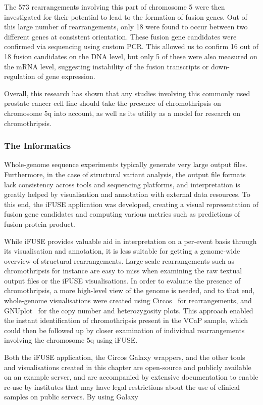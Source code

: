 The 573 rearrangements involving this part of chromosome 5 were then investigated for their potential to lead to the formation of fusion genes. Out of this large number of rearrangements, only 18 were found to occur between two different genes at consistent orientation. These fusion gene candidates were confirmed via sequencing using custom PCR. This allowed us to confirm 16 out of 18 fusion candidates on the DNA level, but only 5 of these were also measured on the mRNA level, suggesting instability of the fusion transcripts or down-regulation of gene expression.

Overall, this research has shown that any studies involving this commonly used prostate cancer cell line should take the presence of chromothripsis on chromosome 5q into account, as well as its utility as a model for research on chromothripsis.

\subsubsection{The Informatics}
Whole-genome sequence experiments typically generate very large output files. Furthermore, in the case of structural variant analysis, the output file formats lack consistency across tools and sequencing platforms, and interpretation is greatly helped by visualisation and annotation with external data resources. To this end, the iFUSE application was developed, creating a visual representation of fusion gene candidates and computing various metrics such as predictions of fusion protein product.

While iFUSE provides valuable aid in interpretation on a per-event basis through its visualisation and annotation, it is less suitable for getting a genome-wide overview of structural rearrangements. Large-scale rearrangements such as chromothripsis for instance are easy to miss when examining the raw textual output files or the iFUSE visualisations. In order to evaluate the presence of chromothripsis, a more high-level view of the genome is needed, and to that end, whole-genome visualisations were created using Circos~\cite{circos} for rearrangements, and GNUplot~\cite{url-gnuplot} for the copy number and heterozygosity plots. This approach enabled the instant identification of chromothripsis present in the VCaP sample, which could then be followed up by closer examination of individual rearrangements involving the chromosome 5q using iFUSE.

Both the iFUSE application, the Circos Galaxy wrappers, and the other tools and visualisations created in this chapter are open-source and publicly available on an example server, and are accompanied by extensive documentation to enable re-use by institutes that may have legal restrictions about the use of clinical samples on public servers. By using Galaxy


